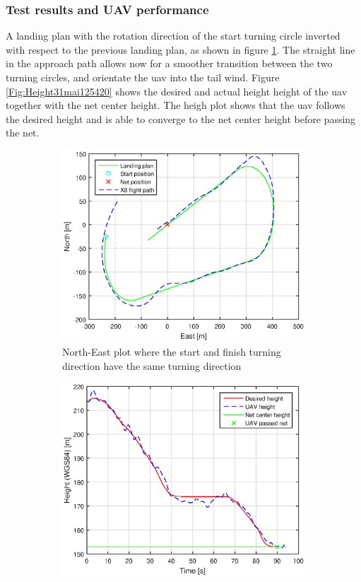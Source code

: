 \subsubsection{Test results and UAV performance}
A landing plan with the rotation direction of the start turning circle inverted with respect to the previous landing plan, as shown in figure \ref{Fig:NorthEast31mai125420}. The straight line in the approach path allows now for a smoother transition between the two turning circles, and orientate the \gls{uav} into the tail wind. Figure \ref{Fig:Height31mai125420} shows the desired and actual height height of the \gls{uav} together with the net center height. The heigh plot shows that the \gls{uav} follows the desired height and is able to converge to the net center height before passing the net.
\newpage
\begin{figure}[H]
\centering
\begin{subfigure}{0.7\textwidth}
		\includegraphics[width=\textwidth]{figs/Experiment/NorthEast31mai125420.eps}
	\caption{North-East plot where the start and finish turning direction have the same turning direction}
	\label{Fig:NorthEast31mai125420}
\end{subfigure}
\begin{subfigure}{0.7\textwidth}
		\includegraphics[width=\textwidth]{figs/Experiment/Height31mai125420.eps}

\end{subfigure}
\end{figure}
